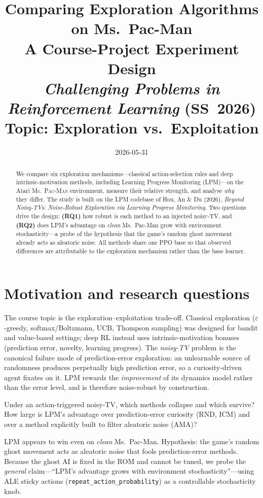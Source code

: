 \documentclass[11pt]{article}
\title{\textbf{Comparing Exploration Algorithms on Ms.\ Pac-Man}\\
\large A Course-Project Experiment Design\\
\normalsize \emph{Challenging Problems in Reinforcement Learning} (SS~2026)\\
\normalsize Topic: Exploration vs.\ Exploitation}
\author{}
\date{2026-05-31}
\begin{document}
\maketitle

\begin{abstract}
\noindent We compare six exploration mechanisms---classical action-selection rules and deep
intrinsic-motivation methods, including Learning Progress Monitoring (LPM)---on the Atari
\textsc{Ms.\ Pac-Man} environment, measure their relative strength, and analyse \emph{why} they
differ. The study is built on the LPM codebase of Hou, An \& Du (2026), \emph{Beyond Noisy-TVs:
Noise-Robust Exploration via Learning Progress Monitoring}. Two questions drive the design:
\textbf{(RQ1)} how robust is each method to an injected noisy-TV, and \textbf{(RQ2)} does LPM's
advantage on \emph{clean} Ms.\ Pac-Man grow with environment stochasticity---a probe of the
hypothesis that the game's random ghost movement already acts as aleatoric noise.
All methods share one PPO base so that observed differences are attributable to the exploration
mechanism rather than the base learner.
\end{abstract}

\section{Motivation and research questions}
The course topic is the exploration--exploitation trade-off. Classical exploration
(\(\varepsilon\)-greedy, softmax/Boltzmann, UCB, Thompson sampling) was designed for bandit and
value-based settings; deep RL instead uses intrinsic-motivation bonuses (prediction error, novelty,
learning progress). The \emph{noisy-TV} problem is the canonical failure mode of prediction-error
exploration: an unlearnable source of randomness produces perpetually high prediction error, so a
curiosity-driven agent fixates on it. LPM rewards the \emph{improvement} of its dynamics model
rather than the error level, and is therefore noise-robust by construction.

\begin{description}[leftmargin=2.2em,style=nextline]
  \item[RQ1 (noise robustness, reproduction).] Under an action-triggered noisy-TV, which methods
  collapse and which survive? How large is LPM's advantage over prediction-error curiosity (RND,
  ICM) and over a method explicitly built to filter aleatoric noise (AMA)?
  \item[RQ2 (stochasticity attribution, novelty).] LPM appears to win even on \emph{clean}
  Ms.\ Pac-Man. Hypothesis: the game's random ghost movement acts as aleatoric noise that fools
  prediction-error methods. Because the ghost AI is fixed in the ROM and cannot be tuned, we probe
  the \emph{general} claim---``LPM's advantage grows with environment stochasticity''---using ALE
  sticky actions (\texttt{repeat\_action\_probability}) as a controllable stochasticity knob.
\end{description}
\end{document}
